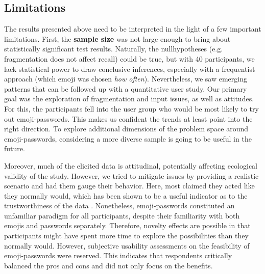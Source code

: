 \subsection{Limitations}
The results presented above need to be interpreted in the light of a few important limitations. First, the \textbf{sample size} was not large enough to bring about statistically significant test results. Naturally, the nullhypotheses (e.g. fragmentation does not affect recall) could be true, but with 40 participants, we lack statistical power to draw conclusive inferences, especially with a frequentist approach (which emoji was chosen \textit{how often}). Nevertheless, we saw emerging patterns that can be followed up with a quantitative user study. Our primary goal was the exploration of fragmentation and input issues, as well as attitudes. For this, the participants fell into the user group who would be most likely to try out emoji-passwords. This makes us confident the trends at least point into the right direction. To explore additional dimensions of the problem space around emoji-passwords, considering a more diverse sample is going to be useful in the future.

Moreover, much of the elicited data is attitudinal, potentially affecting ecological validity of the study. However, we tried to mitigate issues by providing a realistic scenario and had them gauge their behavior. Here, most claimed they acted like they normally would, which has been shown to be a useful indicator as to the trustworthiness of the data \cite{Fahl2013EcologicalValidityPasswordStudy}. Nonetheless, emoji-passwords constituted an unfamiliar paradigm for all participants, despite their familiarity with both emojis and passwords separately. Therefore, novelty effects are possible in that participants might have spent more time to explore the possibilities than they normally would. However, subjective usability assessments on the feasibility of emoji-passwords were reserved. This indicates that respondents critically balanced the pros and cons and did not only focus on the benefits.


